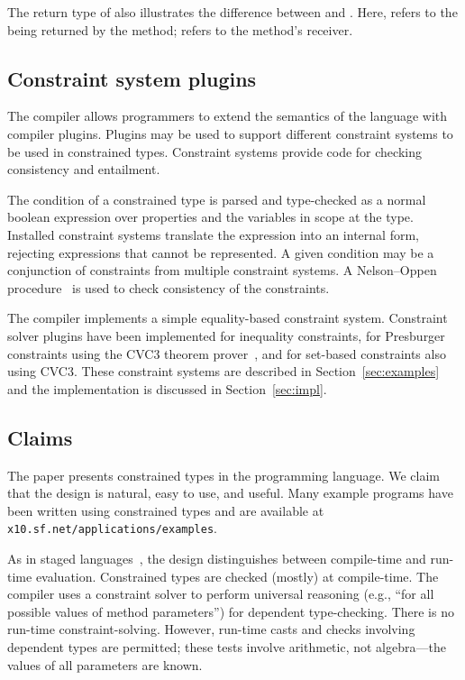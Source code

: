 The return type of  also illustrates the difference
between  and .  Here,  refers to
the  being returned by the method;  refers
to the method's receiver.

\subsection{Constraint system plugins}

The \Xten{} compiler allows  
programmers to extend the semantics of the language with
compiler plugins.  Plugins may be used to support different constraint
systems to be used in constrained types.
Constraint systems provide code for checking consistency and
entailment.

The condition of a constrained type is parsed and type-checked
as a normal boolean expression over properties and
the  variables in scope at the type.  Installed
constraint systems translate the expression into an internal
form, rejecting expressions that cannot be represented.
%
A given condition may be a conjunction of constraints from
multiple constraint systems.
A Nelson--Oppen procedure~\cite{nelson-oppen} is used to check
consistency of the constraints.

The \Xten{} compiler
implements a simple
equality-based constraint system.  Constraint solver plugins
have been implemented for inequality constraints, for
Presburger constraints using
the CVC3 theorem prover~\cite{cvc}, and for
set-based constraints also using CVC3.
These constraint systems are described in
Section~\ref{sec:examples} and the implementation is
discussed in Section~\ref{sec:impl}.

\subsection{Claims}

The paper presents constrained types in the \Xten{} programming
language.
We claim that the design is natural, easy to use, and useful. Many
example programs have been written using constrained types and are
available at {\tt x10.sf.net/\allowbreak applications/\allowbreak examples}.

As in staged languages~\cite{nielson-multistage,ts97-multistage}, the
design distinguishes between compile-time and run-time
evaluation. Constrained types are checked (mostly) at compile-time.
The compiler uses a constraint solver to perform universal reasoning
(e.g., ``for all possible values of method parameters'') for dependent
type-checking.  There is no run-time constraint-solving.  However,
run-time casts and  checks involving dependent types
are permitted; these tests involve
arithmetic, not algebra---the values of all parameters are known.

